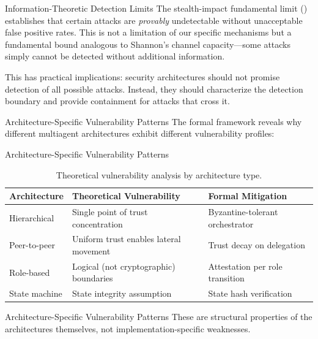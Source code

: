 \documentclass[
  ignorenonframetext,
]{beamer}
\providecommand{\cref}[1]{\texttt{\detokenize{#1}}}
\begin{document}
\begin{frame}[allowframebreaks]{Information-Theoretic Detection Limits}
\protect{}\label{information-theoretic-detection-limits}
The stealth-impact fundamental limit (\cref{thm:stealth-impact})
establishes that certain attacks are \emph{provably} undetectable
without unacceptable false positive rates. This is not a limitation of
our specific mechanisms but a fundamental bound analogous to Shannon's
channel capacity---some attacks simply cannot be detected without
additional information.

This has practical implications: security architectures should not
promise detection of all possible attacks. Instead, they should
characterize the detection boundary and provide containment for attacks
that cross it.
\end{frame}

\begin{frame}[allowframebreaks]{Architecture-Specific Vulnerability
Patterns}
\protect{}\label{architecture-specific-vulnerability-patterns}
The formal framework reveals why different multiagent architectures
exhibit different vulnerability profiles:

\end{frame}

\begin{frame}[allowframebreaks]{Architecture-Specific Vulnerability
Patterns}
\begin{table}[htbp]
\centering
\caption{Theoretical vulnerability analysis by architecture type.}
\label{tab:architecture-theory}
\begin{tabular}{@{}lll@{}}
\toprule
Architecture & Theoretical Vulnerability & Formal Mitigation \\
\midrule
Hierarchical & Single point of trust concentration & Byzantine-tolerant orchestrator \\
Peer-to-peer & Uniform trust enables lateral movement & Trust decay on delegation \\
Role-based & Logical (not cryptographic) boundaries & Attestation per role transition \\
State machine & State integrity assumption & State hash verification \\
\bottomrule
\end{tabular}
\end{table}

\end{frame}

\begin{frame}[allowframebreaks]{Architecture-Specific Vulnerability
Patterns}
These are structural properties of the architectures themselves, not
implementation-specific weaknesses.
\end{frame}
\end{document}
